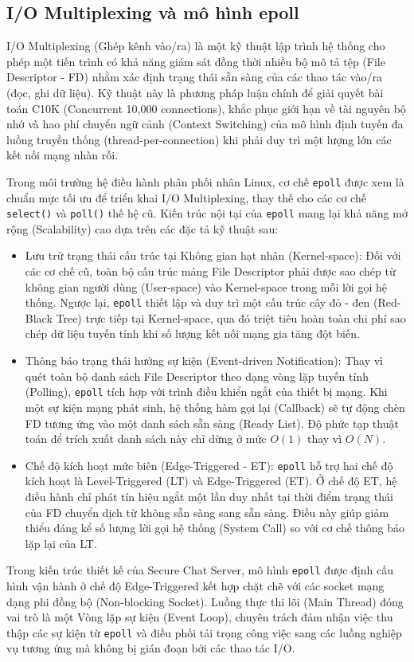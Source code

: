 \subsection{I/O Multiplexing và mô hình epoll}

I/O Multiplexing (Ghép kênh vào/ra) là một kỹ thuật lập trình hệ thống cho phép một tiến trình có khả năng giám sát đồng thời nhiều bộ mô tả tệp (File Descriptor - FD) nhằm xác định trạng thái sẵn sàng của các thao tác vào/ra (đọc, ghi dữ liệu). Kỹ thuật này là phương pháp luận chính để giải quyết bài toán C10K (Concurrent 10,000 connections), khắc phục giới hạn về tài nguyên bộ nhớ và hao phí chuyển ngữ cảnh (Context Switching) của mô hình định tuyến đa luồng truyền thống (thread-per-connection) khi phải duy trì một lượng lớn các kết nối mạng nhàn rỗi.

Trong môi trường hệ điều hành phân phối nhân Linux, cơ chế \texttt{epoll} được xem là chuẩn mực tối ưu để triển khai I/O Multiplexing, thay thế cho các cơ chế \texttt{select()} và \texttt{poll()} thế hệ cũ. Kiến trúc nội tại của \texttt{epoll} mang lại khả năng mở rộng (Scalability) cao dựa trên các đặc tả kỹ thuật sau:
\begin{itemize}[label={-}]
    \item Lưu trữ trạng thái cấu trúc tại Không gian hạt nhân (Kernel-space): Đối với các cơ chế cũ, toàn bộ cấu trúc mảng File Descriptor phải được sao chép từ không gian người dùng (User-space) vào Kernel-space trong mỗi lời gọi hệ thống. Ngược lại, \texttt{epoll} thiết lập và duy trì một cấu trúc cây đỏ - đen (Red-Black Tree) trực tiếp tại Kernel-space, qua đó triệt tiêu hoàn toàn chi phí sao chép dữ liệu tuyến tính khi số lượng kết nối mạng gia tăng đột biến.
    \item Thông báo trạng thái hướng sự kiện (Event-driven Notification): Thay vì quét toàn bộ danh sách File Descriptor theo dạng vòng lặp tuyến tính (Polling), \texttt{epoll} tích hợp với trình điều khiển ngắt của thiết bị mạng. Khi một sự kiện mạng phát sinh, hệ thống hàm gọi lại (Callback) sẽ tự động chèn FD tương ứng vào một danh sách sẵn sàng (Ready List). Độ phức tạp thuật toán để trích xuất danh sách này chỉ dừng ở mức $O(1)$ thay vì $O(N)$.
    \item Chế độ kích hoạt mức biên (Edge-Triggered - ET): \texttt{epoll} hỗ trợ hai chế độ kích hoạt là Level-Triggered (LT) và Edge-Triggered (ET). Ở chế độ ET, hệ điều hành chỉ phát tín hiệu ngắt một lần duy nhất tại thời điểm trạng thái của FD chuyển dịch từ không sẵn sàng sang sẵn sàng. Điều này giúp giảm thiểu đáng kể số lượng lời gọi hệ thống (System Call) so với cơ chế thông báo lặp lại của LT.
\end{itemize}

Trong kiến trúc thiết kế của Secure Chat Server, mô hình \texttt{epoll} được định cấu hình vận hành ở chế độ Edge-Triggered kết hợp chặt chẽ với các socket mạng dạng phi đồng bộ (Non-blocking Socket). Luồng thực thi lõi (Main Thread) đóng vai trò là một Vòng lặp sự kiện (Event Loop), chuyên trách đảm nhận việc thu thập các sự kiện từ \texttt{epoll} và điều phối tải trọng công việc sang các luồng nghiệp vụ tương ứng mà không bị gián đoạn bởi các thao tác I/O.
